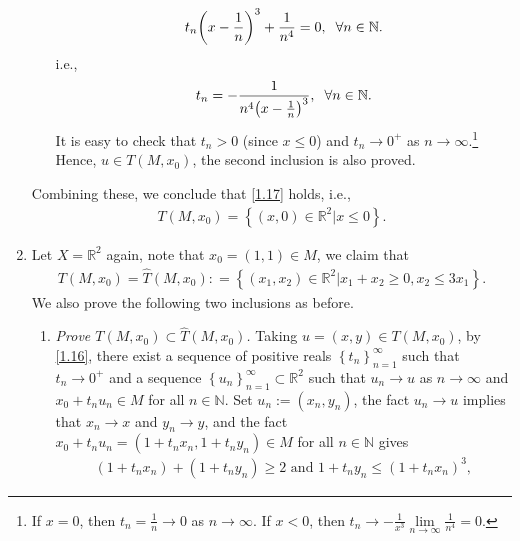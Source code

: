\documentclass[a4paper]{article}
\numberwithin{equation}{section}
\begin{document}
\begin{enumerate}
\begin{enumerate}
\begin{align}
{t_n}{\left( {x - \frac{1}{n}} \right)^3} + \frac{1}{{{n^4}}} = 0,\hspace{0.2cm}\forall n \in \mathbb{N}.
\end{align}
i.e., 
\begin{align}
{t_n} =  - \frac{1}{{{n^4}{{\left( {x - \frac{1}{n}} \right)}^3}}},\hspace{0.2cm}\forall n \in \mathbb{N}.
\end{align}
It is easy to check that $t_n>0$ (since $x\le 0$) and $t_n \to 0^+$ as $n\to \infty$.\footnote{If $x=0$, then $t_n=\frac{1}{n}\to 0$ as $n\to \infty$. If $x<0$, then ${t_n} \to  - \frac{1}{{{x^3}}}\mathop {\lim }\limits_{n \to \infty } \frac{1}{{{n^4}}} = 0$.} Hence, $u\in T\left(M,x_0\right)$, the second inclusion is also proved.
\end{enumerate}
Combining these, we conclude that \eqref{1.17} holds, i.e., 
\begin{align}
T\left( {M,{x_0}} \right) = \left\{ {\left( {x,0} \right) \in {\mathbb{R}^2}|x \le 0} \right\}.
\end{align}
\item Let $X=\mathbb{R}^2$ again, note that $x_0=\left(1,1\right)\in M$, we claim that
\begin{align}
\label{1.23}
T\left( {M,{x_0}} \right) = \widehat T\left( {M,{x_0}} \right): = \left\{ {\left( {{x_1},{x_2}} \right) \in {\mathbb{R}^2}|{x_1} + {x_2} \ge 0,{x_2} \le 3{x_1}} \right\}.
\end{align}
We also prove the following two inclusions as before.
\begin{enumerate}
\item \textit{Prove $T\left( {M,{x_0}} \right) \subset \widehat T\left( {M,{x_0}} \right)$.} Taking $u=\left(x,y\right) \in T\left(M,x_0\right)$, by \eqref{1.16}, there exist a sequence of positive reals $\left\{ {{t_n}} \right\}_{n = 1}^\infty $ such that $t_n\to 0^+$ and a sequence $\left\{ {{u_n}} \right\}_{n = 1}^\infty  \subset {\mathbb{R}^2}$ such that $u_n\to u$ as $n\to \infty$ and $x_0+t_nu_n\in M$ for all $n\in \mathbb{N}$. Set $u_n:=\left(x_n,y_n\right)$, the fact $u_n\to u$ implies that $x_n\to x$ and $y_n\to y$, and the fact $x_0 + t_nu_n =\left(1+t_nx_n,1+t_ny_n\right) \in M$ for all $n\in \mathbb{N}$ gives
\begin{align}
\label{1.24}
\left( {1 + {t_n}{x_n}} \right) + \left( {1 + {t_n}{y_n}} \right) \ge 2\mbox{ and } 1 + {t_n}{y_n} \le {\left( {1 + {t_n}{x_n}} \right)^3},
\end{align}

\end{enumerate}
\end{enumerate}
\end{document}
